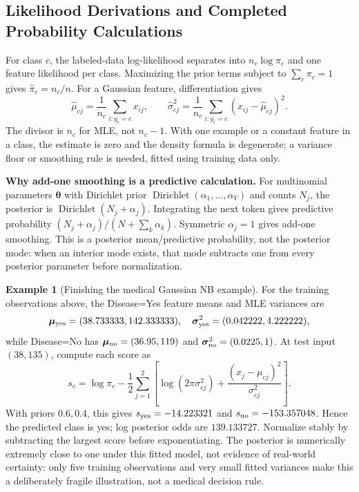 \documentclass[11pt,twoside]{article}
\numberwithin{equation}{section}
\newcommand{\vect}[1]{\bm{#1}}
\theoremstyle{plain}
\theoremstyle{definition}
\newtheorem{example}[theorem]{Example}
\theoremstyle{remark}
\begin{document}
\subsection{Likelihood Derivations and Completed Probability Calculations}
\label{sec:nb-worked}
For class $c$, the labeled-data log-likelihood separates into $n_c\log\pi_c$ and one feature likelihood per class. Maximizing the prior terms subject to $\sum_c\pi_c=1$ gives $\hat\pi_c=n_c/n$. For a Gaussian feature, differentiation gives
\[
\hat\mu_{cj}=\frac1{n_c}\sum_{i:y_i=c}x_{ij},\qquad
\hat\sigma_{cj}^2=\frac1{n_c}\sum_{i:y_i=c}(x_{ij}-\hat\mu_{cj})^2.
\]
The divisor is $n_c$ for MLE, not $n_c-1$. With one example or a constant feature in a class, the estimate is zero and the density formula is degenerate; a variance floor or smoothing rule is needed, fitted using training data only.

\textbf{Why add-one smoothing is a predictive calculation.} For multinomial parameters $\vect\theta$ with Dirichlet prior $\operatorname{Dirichlet}(\alpha_1,\ldots,\alpha_V)$ and counts $N_j$, the posterior is $\operatorname{Dirichlet}(N_j+\alpha_j)$. Integrating the next token gives predictive probability $(N_j+\alpha_j)/(N+\sum_k\alpha_k)$. Symmetric $\alpha_j=1$ gives add-one smoothing. This is a posterior mean/predictive probability, not the posterior mode: when an interior mode exists, that mode subtracts one from every posterior parameter before normalization.

\begin{example}[Finishing the medical Gaussian NB example]
For the training observations above, the Disease=Yes feature means and MLE variances are
\[
\vect\mu_{\rm yes}=(38.733333,142.333333),\quad
\vect\sigma^2_{\rm yes}=(0.042222,4.222222),
\]
while Disease=No has $\vect\mu_{\rm no}=(36.95,119)$ and $\vect\sigma^2_{\rm no}=(0.0225,1)$. At test input $(38,135)$, compute each score as
\[
s_c=\log\pi_c-\frac12\sum_{j=1}^2\left[\log(2\pi\sigma_{cj}^2)+\frac{(x_j-\mu_{cj})^2}{\sigma_{cj}^2}\right].
\]
With priors $0.6,0.4$, this gives $s_{\rm yes}=-14.223321$ and $s_{\rm no}=-153.357048$. Hence the predicted class is yes; log posterior odds are $139.133727$. Normalize stably by subtracting the largest score before exponentiating. The posterior is numerically extremely close to one under this fitted model, not evidence of real-world certainty: only five training observations and very small fitted variances make this a deliberately fragile illustration, not a medical decision rule.
\end{example}
\end{document}

